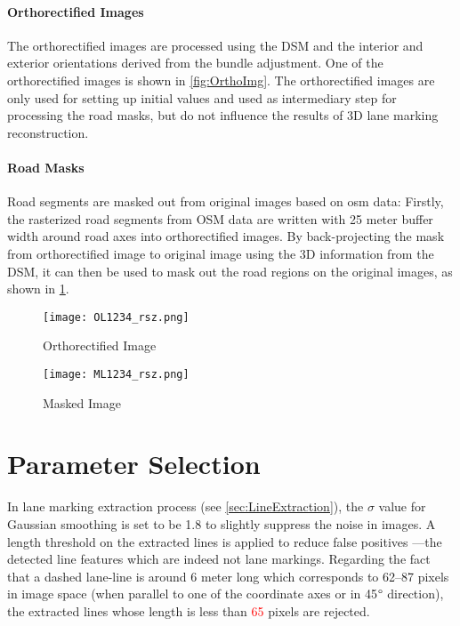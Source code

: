 \paragraph{Orthorectified Images}
The orthorectified images are processed using the DSM and the interior and exterior orientations derived from the bundle adjustment. One of the orthorectified images is shown in \cref{fig:OrthoImg}. The orthorectified images are only used for setting up initial values and used as intermediary step for processing the road masks, but do not influence the results of 3D lane marking reconstruction.

\paragraph{Road Masks}
Road segments are masked out from original images based on \gls{osm} data: Firstly, the rasterized road segments from OSM data are written with 25 meter buffer width around road axes into orthorectified images. By back-projecting the mask from orthorectified image to original image using the 3D information from the DSM, it can then be used to mask out the road regions on the original images, as shown in \cref{fig:MaskedImg}.

\begin{figure}%
	\centering
    	\texttt{[image: OL1234\_rsz.png]}
    	\caption{\small Orthorectified Image}
    	\label{fig:OrthoImg}
	\vspace{1cm}
		\texttt{[image: ML1234\_rsz.png]}
		\caption{\small Masked Image}
		\label{fig:MaskedImg}
\end{figure}

\clearpage
\section{Parameter Selection}
\label{sec:ParameterSelection}

In lane marking extraction process (see \cref{sec:LineExtraction}), the $\sigma$ value for Gaussian smoothing is set to be 1.8 to slightly suppress the noise in images. %
A length threshold on the extracted lines is applied to reduce false positives ---the detected line features which are indeed not lane markings. Regarding the fact that a dashed lane-line is around 6 meter long which corresponds to 62--87 pixels in image space (when parallel to one of the coordinate axes or in 45$\degree$ direction), the extracted lines whose length is less than \textcolor{red}{65} pixels are rejected.


